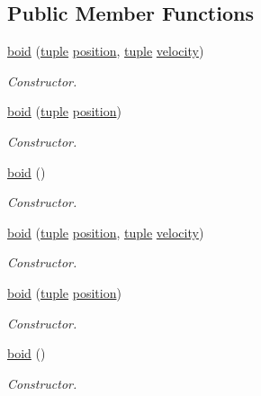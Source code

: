 \subsection*{Public Member Functions}
\begin{DoxyCompactItemize}
\item 
\hyperlink{classboid_aede77aaa7f5e0473012dd4e251c09a57}{boid} (\hyperlink{classtuple}{tuple} \hyperlink{classboid_aa6af55bf8ffe2a9a19332d12ec632a06}{position}, \hyperlink{classtuple}{tuple} \hyperlink{classboid_a811f5915fa6b7eea89f02b5a455baca4}{velocity})
\begin{DoxyCompactList}\small\item\em Constructor. \end{DoxyCompactList}\item 
\hyperlink{classboid_a1c6b31132d5663db1b623b3c7eb27165}{boid} (\hyperlink{classtuple}{tuple} \hyperlink{classboid_aa6af55bf8ffe2a9a19332d12ec632a06}{position})
\begin{DoxyCompactList}\small\item\em Constructor. \end{DoxyCompactList}\item 
\hyperlink{classboid_a66be2fb9f12b5296304957759ded821a}{boid} ()
\begin{DoxyCompactList}\small\item\em Constructor. \end{DoxyCompactList}\item 
\hyperlink{classboid_aede77aaa7f5e0473012dd4e251c09a57}{boid} (\hyperlink{classtuple}{tuple} \hyperlink{classboid_aa6af55bf8ffe2a9a19332d12ec632a06}{position}, \hyperlink{classtuple}{tuple} \hyperlink{classboid_a811f5915fa6b7eea89f02b5a455baca4}{velocity})
\begin{DoxyCompactList}\small\item\em Constructor. \end{DoxyCompactList}\item 
\hyperlink{classboid_a1c6b31132d5663db1b623b3c7eb27165}{boid} (\hyperlink{classtuple}{tuple} \hyperlink{classboid_aa6af55bf8ffe2a9a19332d12ec632a06}{position})
\begin{DoxyCompactList}\small\item\em Constructor. \end{DoxyCompactList}\item 
\hyperlink{classboid_a66be2fb9f12b5296304957759ded821a}{boid} ()
\begin{DoxyCompactList}\small\item\em Constructor. \end{DoxyCompactList}\end{DoxyCompactItemize}
